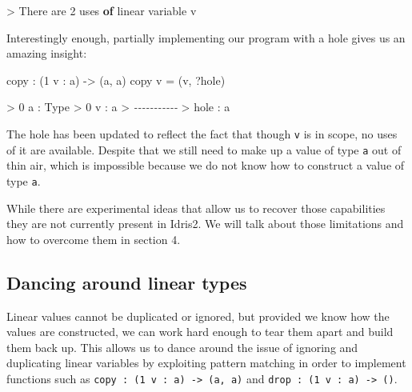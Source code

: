 \documentclass[
]{article}
\newenvironment{Shaded}{}{}
\newcommand{\CommentTok}[1]{\textcolor[rgb]{0.38,0.63,0.69}{\textit{#1}}}
\newcommand{\DataTypeTok}[1]{\textcolor[rgb]{0.56,0.13,0.00}{#1}}
\newcommand{\DecValTok}[1]{\textcolor[rgb]{0.25,0.63,0.44}{#1}}
\newcommand{\KeywordTok}[1]{\textcolor[rgb]{0.00,0.44,0.13}{\textbf{#1}}}
\newcommand{\NormalTok}[1]{#1}
\newcommand{\OperatorTok}[1]{\textcolor[rgb]{0.40,0.40,0.40}{#1}}
\newcommand{\OtherTok}[1]{\textcolor[rgb]{0.00,0.44,0.13}{#1}}
\begin{document}
\begin{Shaded}
\begin{Highlighting}[]
\OperatorTok{\textgreater{}} \DataTypeTok{There}\NormalTok{ are }\DecValTok{2}\NormalTok{ uses }\KeywordTok{of}\NormalTok{ linear variable v}
\end{Highlighting}
\end{Shaded}

Interestingly enough, partially implementing our program with a hole
gives us an amazing insight:

\begin{Shaded}
\begin{Highlighting}[]
\NormalTok{copy }\OperatorTok{:}\NormalTok{ (}\DecValTok{1}\NormalTok{ v }\OperatorTok{:}\NormalTok{ a) }\OtherTok{{-}\textgreater{}}\NormalTok{ (a, a)}
\NormalTok{copy v }\OtherTok{=}\NormalTok{ (v, }\OperatorTok{?}\NormalTok{hole)}
\end{Highlighting}
\end{Shaded}

\begin{Shaded}
\begin{Highlighting}[]
\OperatorTok{\textgreater{}} \DecValTok{0}\NormalTok{ a }\OperatorTok{:} \DataTypeTok{Type}
\OperatorTok{\textgreater{}} \DecValTok{0}\NormalTok{ v }\OperatorTok{:}\NormalTok{ a}
\OperatorTok{\textgreater{}} \CommentTok{{-}{-}{-}{-}{-}{-}{-}{-}{-}{-}{-}}
\OperatorTok{\textgreater{}}\NormalTok{ hole }\OperatorTok{:}\NormalTok{ a}
\end{Highlighting}
\end{Shaded}

The hole has been updated to reflect the fact that though \texttt{v} is
in scope, no uses of it are available. Despite that we still need to
make up a value of type \texttt{a} out of thin air, which is impossible
because we do not know how to construct a value of type \texttt{a}.

While there are experimental ideas that allow us to recover those
capabilities they are not currently present in Idris2. We will talk
about those limitations and how to overcome them in section 4.

\hypertarget{dancing-around-linear-types}{%
\subsection{Dancing around linear
types}\label{dancing-around-linear-types}}

Linear values cannot be duplicated or ignored, but provided we know how
the values are constructed, we can work hard enough to tear them apart
and build them back up. This allows us to dance around the issue of
ignoring and duplicating linear variables by exploiting pattern matching
in order to implement functions such as
\texttt{copy\ :\ (1\ v\ :\ a)\ \textasciigrave{}-\textgreater{}\ (a,\ a)}
and \texttt{drop\ :\ (1\ v\ :\ a)\ -\textgreater{}\ ()}.
\end{document}
